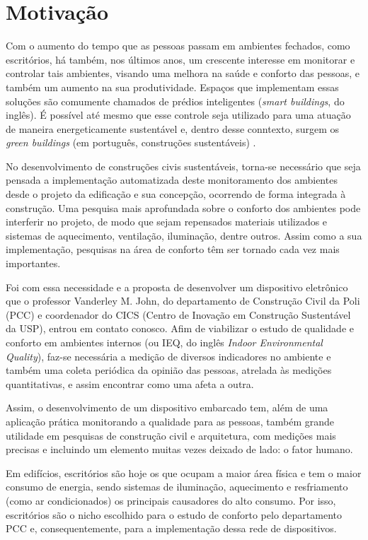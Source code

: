 \documentclass[../monografia.tex]{subfiles}
\begin{document}
\section{Motivação}

Com o aumento do tempo que as pessoas passam em ambientes fechados, como escritórios, há também, nos últimos anos, um crescente interesse em monitorar e controlar tais ambientes, visando uma melhora na saúde e conforto das pessoas, e também um aumento na sua produtividade. Espaços que implementam essas soluções são comumente chamados de prédios inteligentes (\textit{smart buildings}, do inglês). É possível até mesmo que esse controle seja utilizado para uma atuação de maneira energeticamente sustentável e, dentro desse conntexto, surgem os \textit{green buildings} (em português, construções sustentáveis) \cite{GreenBuildings} \cite{EnergyBuildings}.

No desenvolvimento de construções civis sustentáveis, torna-se necessário que seja pensada a implementação automatizada deste monitoramento dos ambientes desde o projeto da edificação e sua concepção, ocorrendo de forma integrada à construção. Uma pesquisa mais aprofundada sobre o conforto dos ambientes pode interferir no projeto, de modo que sejam repensados materiais utilizados e sistemas de aquecimento, ventilação, iluminação, dentre outros. Assim como a sua implementação, pesquisas na área de conforto têm ser tornado cada vez mais importantes. 

Foi com essa necessidade e a proposta de desenvolver um dispositivo eletrônico que o professor Vanderley M. John, do departamento de Construção Civil da Poli (PCC) e coordenador do CICS (Centro de Inovação em Construção Sustentável da USP)\cite{CICS}, entrou em contato conosco. Afim de viabilizar o estudo de qualidade e conforto em ambientes internos (ou IEQ, do inglês \textit{Indoor Environmental Quality}), faz-se necessária a medição de diversos indicadores no ambiente e também uma coleta periódica da opinião das pessoas, atrelada às medições quantitativas, e assim encontrar como uma afeta a outra. 

Assim, o desenvolvimento de um dispositivo embarcado tem, além de uma aplicação prática monitorando a qualidade para as pessoas, também grande utilidade em pesquisas de construção civil e arquitetura, com medições mais precisas e incluindo um elemento muitas vezes deixado de lado: o fator humano.

Em edifícios, escritórios são hoje os que ocupam a maior área física e tem o maior consumo de energia, sendo sistemas de iluminação, aquecimento e resfriamento (como ar condicionados) os principais causadores do alto consumo\cite{EnergyBuildings}. Por isso, escritórios são o nicho escolhido para o estudo de conforto pelo departamento PCC e, consequentemente, para a implementação dessa rede de dispositivos. 
\end{document}
